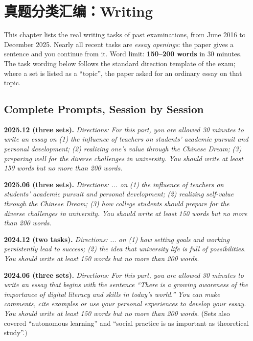 \section{真题分类汇编：Writing}

This chapter lists the real writing tasks of past examinations, from June 2016 to December 2025. Nearly all recent tasks are \emph{essay openings}: the paper gives a sentence and you continue from it. Word limit: \textbf{150--200 words} in 30 minutes. The task wording below follows the standard direction template of the exam; where a set is listed as a ``topic'', the paper asked for an ordinary essay on that topic.

\subsection{Complete Prompts, Session by Session}

\noindent\textbf{2025.12 (three sets).}\quad
\emph{Directions: For this part, you are allowed 30 minutes to write an essay on (1) the influence of teachers on students' academic pursuit and personal development; (2) realizing one's value through the Chinese Dream; (3) preparing well for the diverse challenges in university. You should write at least 150 words but no more than 200 words.}
\par\medskip

\noindent\textbf{2025.06 (three sets).}\quad
\emph{Directions: ... on (1) the influence of teachers on students' academic pursuit and personal development; (2) realizing self-value through the Chinese Dream; (3) how college students should prepare for the diverse challenges in university. You should write at least 150 words but no more than 200 words.}
\par\medskip

\noindent\textbf{2024.12 (two tasks).}\quad
\emph{Directions: ... on (1) how setting goals and working persistently lead to success; (2) the idea that university life is full of possibilities. You should write at least 150 words but no more than 200 words.}
\par\medskip

\noindent\textbf{2024.06 (three sets).}\quad
\emph{Directions: For this part, you are allowed 30 minutes to write an essay that begins with the sentence ``There is a growing awareness of the importance of digital literacy and skills in today's world.'' You can make comments, cite examples or use your personal experiences to develop your essay. You should write at least 150 words but no more than 200 words.}
(Sets also covered ``autonomous learning'' and ``social practice is as important as theoretical study''.)
\par\medskip

